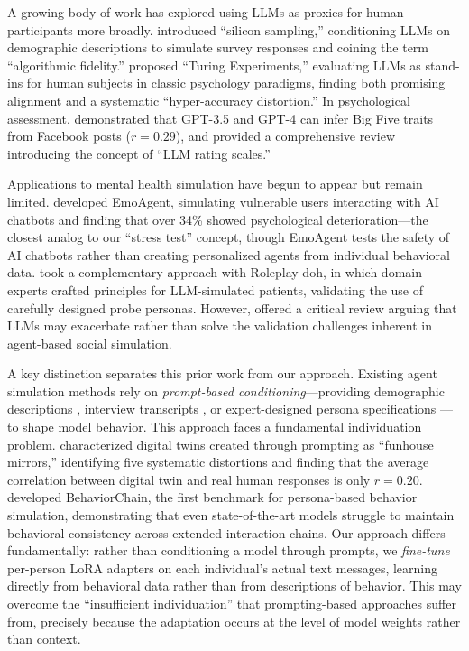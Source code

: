 \documentclass[review,12pt,authoryear]{elsarticle}
\begin{document}
A growing body of work has explored using LLMs as proxies for human participants more broadly. \citet{argyle2023silicon} introduced ``silicon sampling,'' conditioning LLMs on demographic descriptions to simulate survey responses and coining the term ``algorithmic fidelity.'' \citet{aher2023turing} proposed ``Turing Experiments,'' evaluating LLMs as stand-ins for human subjects in classic psychology paradigms, finding both promising alignment and a systematic ``hyper-accuracy distortion.'' In psychological assessment, \citet{peters2024llm} demonstrated that GPT-3.5 and GPT-4 can infer Big Five traits from Facebook posts ($r = 0.29$), and \citet{brickman2025llm} provided a comprehensive review introducing the concept of ``LLM rating scales.''

Applications to mental health simulation have begun to appear but remain limited. \citet{qiu2025emoagent} developed EmoAgent, simulating vulnerable users interacting with AI chatbots and finding that over 34\% showed psychological deterioration---the closest analog to our ``stress test'' concept, though EmoAgent tests the safety of AI chatbots rather than creating personalized agents from individual behavioral data. \citet{louie2024roleplay} took a complementary approach with Roleplay-doh, in which domain experts crafted principles for LLM-simulated patients, validating the use of carefully designed probe personas. However, \citet{tornberg2025validation} offered a critical review arguing that LLMs may exacerbate rather than solve the validation challenges inherent in agent-based social simulation.

A key distinction separates this prior work from our approach. Existing agent simulation methods rely on \textit{prompt-based conditioning}---providing demographic descriptions \citep{argyle2023silicon}, interview transcripts \citep{park2024generative}, or expert-designed persona specifications \citep{louie2024roleplay}---to shape model behavior. This approach faces a fundamental individuation problem. \citet{peng2025funhouse} characterized digital twins created through prompting as ``funhouse mirrors,'' identifying five systematic distortions and finding that the average correlation between digital twin and real human responses is only $r = 0.20$. \citet{li2025behaviorchain} developed BehaviorChain, the first benchmark for persona-based behavior simulation, demonstrating that even state-of-the-art models struggle to maintain behavioral consistency across extended interaction chains. Our approach differs fundamentally: rather than conditioning a model through prompts, we \textit{fine-tune} per-person LoRA adapters on each individual's actual text messages, learning directly from behavioral data rather than from descriptions of behavior. This may overcome the ``insufficient individuation'' that prompting-based approaches suffer from, precisely because the adaptation occurs at the level of model weights rather than context.
\end{document}
